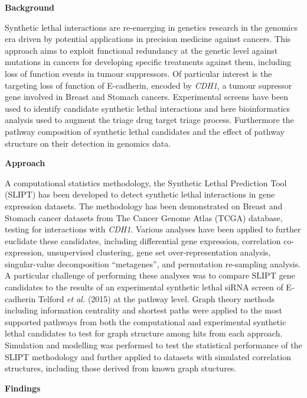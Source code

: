 \textbf{Background}

Synthetic lethal interactions are re-emerging in genetics research in the genomics era driven by potential applications in precision medicine against cancers. This approach aims to exploit functional redundancy at the genetic level against mutations in cancers for developing specific treatments against them, including loss of function events in tumour suppressors. Of particular interest is the targeting loss of function of E-cadherin, encoded by \textit{CDH1}, a tumour supressor gene involved in Breast and Stomach cancers. Experimental screens have been used to identify candidate synthetic lethal interactions and here bioinformatics analysis used to augment the triage drug target triage process. Furthermore the pathway composition of synthetic lethal candidates and the effect of pathway structure on their detection in genomics data. 

\textbf{Approach}

A computational statistics methodology, the Synthetic Lethal Prediction Tool (SLIPT) has been developed to detect synthetic lethal interactions in gene expression datasets. The methodology has been demonstrated on Breast and Stomach cancer datasets from The Cancer Genome Atlas (TCGA) database, testing for interactions with \textit{CDH1}. Various analyses have been applied to further euclidate these candidates, including differential gene expression, correlation co-expression, unsupervised clustering, gene set over-representation analysis, singular-value decomposition ``metagenes'', and permutation re-sampling analysis. A particular challenge of performing these analyses was to compare SLIPT gene candidates to the results of an experimental synthetic lethal siRNA screen of E-cadherin Telford \textit{et al.} (2015) at the pathway level. Graph theory methods including information centrality and shortest paths were applied to the most supported pathways from both the computational and experimental synthetic lethal candidates to test for graph structure among hits from each approach. Simulation and modelling was performed to test the statistical performance of the SLIPT methodology and further applied to datasets with simulated correlation structures, including those derived from known graph stuctures.

\textbf{Findings}

